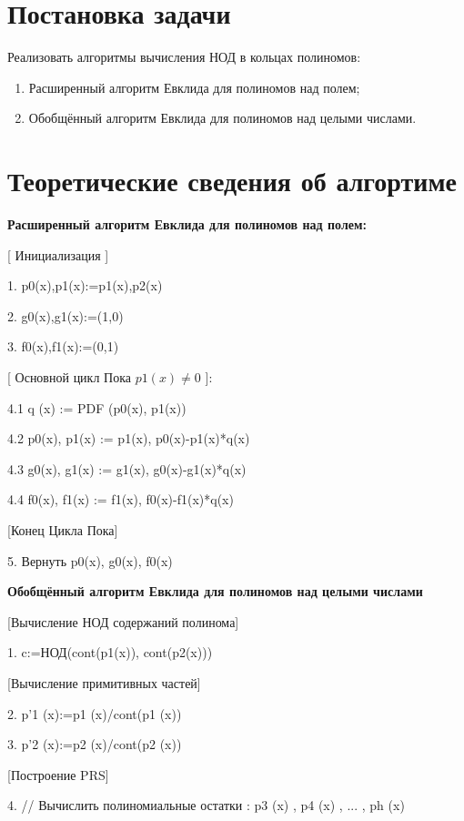 \documentclass[spec, och, labwork]{shiza}
\begin{document}
\tableofcontents

\section{Постановка задачи}

Реализовать алгоритмы вычисления НОД в кольцах полиномов:

\begin{enumerate}
    \item Расширенный алгоритм Евклида для полиномов над полем;
    \item Обобщённый алгоритм Евклида для полиномов над целыми числами.
\end{enumerate}

\section{Теоретические сведения об алгортиме}

\textbf{Расширенный алгоритм Евклида для полиномов над полем:}

[ Инициализация ]

1. p0(x),p1(x):=p1(x),p2(x) 

2. g0(x),g1(x):=(1,0)

3. f0(x),f1(x):=(0,1)

[ Основной цикл Пока $p1(x) \neq 0$ ]:

4.1 q (x) := PDF (p0(x), p1(x))

4.2 p0(x), p1(x) := p1(x), p0(x)-p1(x)*q(x)

4.3 g0(x), g1(x) := g1(x), g0(x)-g1(x)*q(x)

4.4 f0(x), f1(x) := f1(x), f0(x)-f1(x)*q(x)

[Конец Цикла Пока]

5. Вернуть p0(x), g0(x), f0(x)

\textbf{Обобщённый алгоритм Евклида для полиномов над целыми числами}

[Вычисление НОД содержаний полинома]

1. c:=НОД(cont(p1(x)), cont(p2(x)))

[Вычисление примитивных частей]

2. p'1 (x):=p1 (x)/cont(p1 (x))

3. p'2 (x):=p2 (x)/cont(p2 (x))

[Построение PRS]

4. // Вычислить полиномиальные остатки : p3 (x) , p4 (x) , ... , ph (x)
\end{document}
